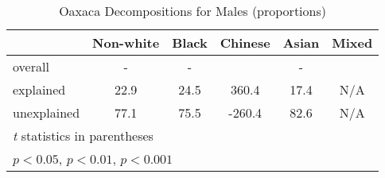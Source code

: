 \begin{table}[htbp]\centering
\caption{Oaxaca Decompositions for Males (proportions)}
\begin{tabular}{l*{5}{c}}
\hline\hline
          &Non-white&    Black&  Chinese&    Asian&    Mixed\\
\hline
overall   &     -    &      -   &         &     -    &         \\
explained &     22.9\sym{***}&     24.5\sym{***}&    360.4\sym{***}&     17.4\sym{***}&    N/A\\
unexplained&     77.1\sym{***}&     75.5\sym{***}&   -260.4\sym{*}&     82.6\sym{***}&     N/A\\
\hline\hline
\multicolumn{6}{l}{\footnotesize \textit{t} statistics in parentheses}\\
\multicolumn{6}{l}{\footnotesize \sym{*} \(p<0.05\), \sym{**} \(p<0.01\), \sym{***} \(p<0.001\)}\\
\end{tabular}
\label{tab:oaxaca_pct_male}
\end{table}
